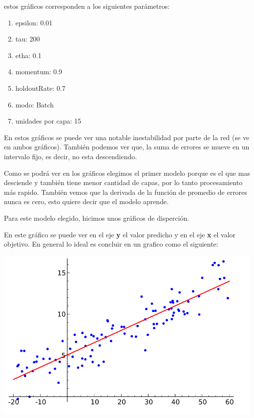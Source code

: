 estos gráficos corresponden a los siguientes parámetros:

\begin{enumerate}
\item epsilon: 0.01
\item tau: 200
\item etha: 0.1
\item momentum: 0.9
\item holdoutRate: 0.7
\item modo: Batch
\item unidades por capa: 15
\end{enumerate}
En estos gráficos se puede ver una notable inestabilidad por parte de la red (se ve en ambos gráficos). También podemos ver que, la suma de errores se mueve en un intervalo fijo, es decir, no esta descendiendo. 

\newpage

Como se podrá ver en los gráficos elegimos el primer modelo porque es el que mas desciende y también tiene menor cantidad de capas, por lo tanto procesamiento más rapido. También vemos que la derivada de la función de promedio de errores nunca es cero, esto quiere decir que el modelo aprende.

Para este modelo elegido, hicimos unos gráficos de disperción. 

En este gráfico se puede ver en el eje \textbf{y} el valor predicho y en el eje \textbf{x} el valor objetivo. En general lo ideal es concluir en un grafico como el siguiente:

\begin{center}
\includegraphics[scale=0.4]{img/regresionperfecta}
\end{center}

